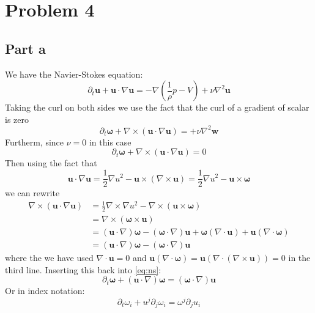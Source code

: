 \documentclass[a4paper,12pt]{article}
\begin{document}
\section*{Problem 4}
\subsection*{Part a}
We have the Navier-Stokes equation:
\begin{equation}
\partial_t \bm u+\bm u\cdot  \nabla\bm u=-\nabla \left(\frac{1}{\rho} p- V\right)+\nu\nabla^2 \bm u
\end{equation}
Taking the curl on both sides we use the fact that the curl of a gradient of scalar is zero 
\begin{equation} \label{eq:ns}
	\partial_t \bm \omega+\nabla\times(\bm u \cdot \nabla\bm u)=+\nu\nabla^2 \bm w
\end{equation}
Furtherm, since $\nu=0$ in this case
\begin{equation} \label{eq:ns}
	\partial_t \bm \omega+\nabla\times(\bm u \cdot \nabla\bm u)=0
\end{equation}
Then using the fact that
\begin{equation}
\bm u \cdot \nabla\bm u=\frac{1}{2}\nabla u^2-\bm u\times (\nabla \times \bm u)=\frac{1}{2}\nabla u^2-\bm u\times \bm \omega
\end{equation}
we can rewrite
\begin{equation}
\begin{aligned}
\nabla\times(\bm u \cdot \nabla\bm u)&=\frac{1}{2}\nabla\times\nabla u^2-\nabla\times (\bm u\times \bm \omega)\\
&=\nabla\times (\bm \omega \times \bm u)\\
&=(\bm u \cdot \nabla)\bm\omega -(\bm \omega  \cdot \nabla)\bm u +\bm\omega (\nabla\cdot \bm u)+\bm u (\nabla\cdot \bm \omega )\\
&=(\bm u \cdot \nabla)\bm\omega -(\bm \omega  \cdot \nabla)\bm u
\end{aligned}
\end{equation}
where the we have used $\nabla\cdot \bm u=0$ and $\bm u(\nabla \cdot \bm \omega)=\bm u(\nabla \cdot (\nabla \times \bm u))=0$ in the third line. Inserting this back into \ref{eq:ns}:
\begin{equation} \label{eq:ns2}
	\partial_t \bm \omega+(\bm u \cdot \nabla)\bm\omega =(\bm \omega  \cdot \nabla)\bm u
\end{equation}
Or in index notation:
\begin{equation} \label{eq:ns2}
	\partial_t \omega_i+ u ^j \partial_j\omega_i = \omega^j  \partial_j u_i
\end{equation}
\end{document}
